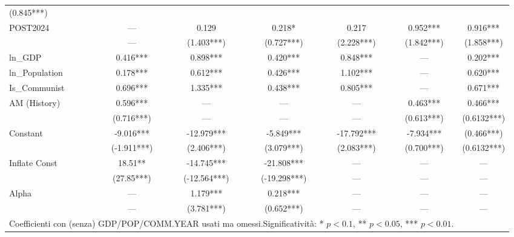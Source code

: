 \begin{table}[H]
{\begin{tabular}{l cccccc}
                (0.845***) \\
POST2024        & ---       & 0.129     & 0.218*    & 0.217     & 0.952*** &
0.916***  \\
                & ---       & (1.403***)& (0.727***)& (2.228***) & (1.842***) &
                (1.858***) \\
\midrule
ln\_GDP         & 0.416***  & 0.898***  & 0.420***  & 0.848***   & ---  &
0.202***     \\
ln\_Population   & 0.178***  & 0.612***  & 0.426***  & 1.102***  & ---  &
0.620***     \\
Is\_Communist    & 0.696***  & 1.335***  & 0.438***  & 0.805***  & ---  &
0.671***     \\
AM (History)    & 0.596***  & ---       & ---       & ---       & 0.463*** &
0.466***      \\
                & (0.716***)  & ---       & ---       & ---       & (0.613***) &
                (0.6132***) \\
\midrule
Constant        & -9.016*** & -12.979***& -5.849*** & -17.792***    & -7.934***
& (0.466***)       \\
                & (-1.911***)& (2.406***)& (3.079***)& (2.083***)   & (0.700***)
                & (0.6132***)      \\
Inflate Const   & 18.51**   & -14.745***& -21.808***& ---           & --- & ---
\\
                & (27.85***)& (-12.564***)& (-19.298***)& ---       & --- & ---
                \\
Alpha           & ---       & 1.179***  & 0.218***  & ---           & --- & ---
\\
                & ---       & (3.781***)& (0.652***)& ---           & --- & ---
                \\
\bottomrule
\multicolumn{6}{l}{\normalsize Coefficienti con (senza) GDP/POP/COMM.\@ YEAR
usati ma omessi.\@ Significatività: * $p<0.1$, ** $p<0.05$, *** $p<0.01$.} \\
\end{tabular}%
}
\end{table}


